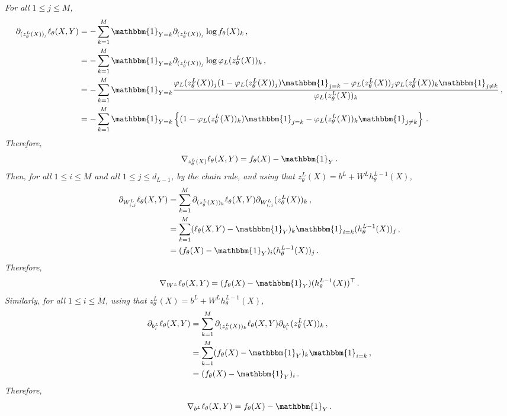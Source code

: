 \documentclass[a4paper,10pt,fleqn]{article}
\newcommand{\eqsp}{\,}
\newcommand{\1}{\ensuremath{\mathbbm{1}}}
\begin{document}
\begin{enumerate}
{\em
For all $1\leqslant j\leqslant M$,
\begin{align*}
\partial_{(z_\theta^L(X))_j}\ell_{\theta}(X,Y) &=  -\sum_{k=1}^{M} \1_{Y=k}\partial_{(z_\theta^L(X))_j}\log f_{\theta}(X)_k\eqsp,\\
&=  -\sum_{k=1}^{M} \1_{Y=k}\partial_{(z_\theta^L(X))_j}\log \varphi_L(z_\theta^L(X))_k\eqsp,\\
&=  -\sum_{k=1}^{M} \1_{Y=k}\frac{\varphi_L(z_\theta^L(X))_j (1-\varphi_L(z_\theta^L(X))_j )\1_{j=k} - \varphi_L(z_\theta^L(X))_j \varphi_L(z_\theta^L(X))_k\1_{j\neq k}}{\varphi_L(z_\theta^L(X))_k}\eqsp,\\
&=  -\sum_{k=1}^{M} \1_{Y=k}\left\{(1-\varphi_L(z_\theta^L(X))_k )\1_{j=k} -  \varphi_L(z_\theta^L(X))_k\1_{j\neq k}\right\}\eqsp.
\end{align*}
Therefore,
$$
\nabla_{z_\theta^L(X)} \ell_{\theta}(X,Y) = f_{\theta}(X) - \1_Y\eqsp.
$$
Then, for all $1\leqslant i\leqslant M$ and all $1\leqslant j \leqslant d_{L-1}$, by the chain rule, and using that $z_{\theta}^L(X) = b^L + W^Lh_{\theta}^{L-1}(X)$,
\begin{align*}
\partial_{W^L_{i,j}}\ell_{\theta}(X,Y) &=  \sum_{k=1}^{M} \partial_{(z_{\theta}^L(X))_k}\ell_{\theta}(X,Y)\partial_{W^L_{i,j}}(z_{\theta}^L(X))_k\eqsp,\\
&=  \sum_{k=1}^{M} (\ell_{\theta}(X,Y) - \1_Y)_k\1_{i=k}(h_{\theta}^{L-1}(X))_j\eqsp,\\
&=  (f_{\theta}(X) - \1_Y)_i(h_{\theta}^{L-1}(X))_j\eqsp.
\end{align*}
Therefore,
$$
\nabla_{W^L} \ell_{\theta}(X,Y) = (f_{\theta}(X) - \1_Y)(h_{\theta}^{L-1}(X))^\top\eqsp.
$$
Similarly, for all $1\leqslant i\leqslant M$,  using that $z_{\theta}^L(X) = b^L + W^Lh_{\theta}^{L-1}(X)$,
\begin{align*}
\partial_{b^L_{i}}\ell_{\theta}(X,Y) &=  \sum_{k=1}^{M} \partial_{(z_{\theta}^L(X))_k}\ell_{\theta}(X,Y)\partial_{b^L_{i}}(z_{\theta}^L(X))_k\eqsp,\\
&=  \sum_{k=1}^{M} (f_{\theta}(X) - \1_Y)_k\1_{i=k}\eqsp,\\
&=  (f_{\theta}(X) - \1_Y)_i\eqsp.
\end{align*}
Therefore,
$$
\nabla_{b^L} \ell_{\theta}(X,Y) = f_{\theta}(X) - \1_Y\eqsp.
$$
}


\end{enumerate}
\end{document}
